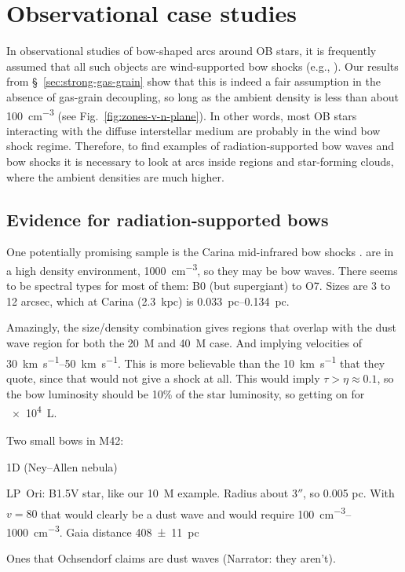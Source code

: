 \section{Observational case studies}
\label{sec:case-studies}

In observational studies of bow-shaped arcs around OB stars, it is
frequently assumed that all such objects are wind-supported bow shocks
(e.g., \citealp{Kobulnicky:2016a}). Our results from
\S~\ref{sec:strong-gas-grain} show that this is indeed a fair
assumption in the absence of gas-grain decoupling, so long as the
ambient density is less than about \SI{100}{cm^{-3}} (see
Fig.~\ref{fig:zones-v-n-plane}). In other words, most OB stars
interacting with the diffuse interstellar medium are probably in the
wind bow shock regime.  Therefore, to find examples of
radiation-supported bow waves and bow shocks it is necessary to look
at arcs inside \hii{} regions and star-forming clouds, where the
ambient densities are much higher.

\subsection{Evidence for radiation-supported bows}

One potentially promising sample is the Carina mid-infrared bow shocks
\citep{Sexton:2015b}.   are in a high density environment,
\SI{1000}{cm^{-3}}, so they may be bow waves.  There seems to be
spectral types for most of them: B0 (but supergiant) to O7.  Sizes are
3 to 12 arcsec, which at Carina (\SI{2.3}{kpc}) is
\SIrange{0.033}{0.134}{pc}.

Amazingly, the size/density combination gives regions that overlap
with the dust wave region for both the \SI{20}{M_\odot} and \SI{40}{M_\odot}
case.  And implying velocities of \SIrange{30}{50}{km.s^{-1}}.  This
is more believable than the \SI{10}{km.s^{-1}} that they quote, since
that would not give a shock at all.  This would imply
\(\tau > \eta \approx 0.1\), so the bow luminosity should be 10\% of the star
luminosity, so getting on for \SI{e4}{L_\odot}.

Two small bows in M42:

\th1D{} (Ney--Allen nebula) \citep{Robberto:2005a}

LP~Ori: B1.5V star, like our \SI{10}{M_\odot} example. Radius about
\(3''\), so 0.005 pc.  With \(v = 80\) that would clearly be a dust
wave and would require \SIrange{100}{1000}{cm^{-3}}. Gaia distance \SI{408 +- 11}{pc}


Ones that Ochsendorf claims are dust waves (Narrator: they aren't).


